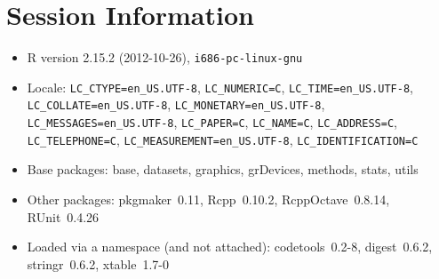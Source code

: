 \documentclass[10pt]{article}
\begin{document}
\section*{Session Information}
\begin{itemize}\raggedright
  \item R version 2.15.2 (2012-10-26), \verb|i686-pc-linux-gnu|
  \item Locale: \verb|LC_CTYPE=en_US.UTF-8|, \verb|LC_NUMERIC=C|, \verb|LC_TIME=en_US.UTF-8|, \verb|LC_COLLATE=en_US.UTF-8|, \verb|LC_MONETARY=en_US.UTF-8|, \verb|LC_MESSAGES=en_US.UTF-8|, \verb|LC_PAPER=C|, \verb|LC_NAME=C|, \verb|LC_ADDRESS=C|, \verb|LC_TELEPHONE=C|, \verb|LC_MEASUREMENT=en_US.UTF-8|, \verb|LC_IDENTIFICATION=C|
  \item Base packages: base, datasets, graphics, grDevices, methods,
    stats, utils
  \item Other packages: pkgmaker~0.11, Rcpp~0.10.2, RcppOctave~0.8.14,
    RUnit~0.4.26
  \item Loaded via a namespace (and not attached): codetools~0.2-8,
    digest~0.6.2, stringr~0.6.2, xtable~1.7-0
\end{itemize}
\end{document}
